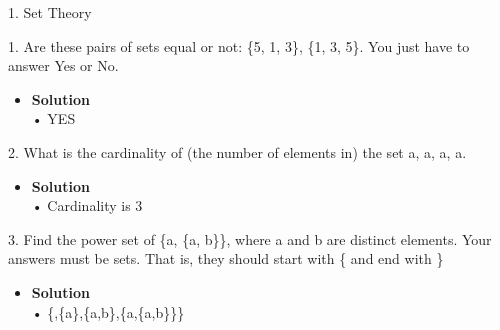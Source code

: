 \documentclass[11pt]{article}
\begin{document}


\begin{flushleft}
{\Large 1. Set Theory}
\end{flushleft}



\begin{enumerate}

\begin{flushleft}
{\large 1. Are these pairs of sets equal or not: \{5, 1, 3\}, \{1, 3, 5\}. You just have to answer Yes or No.}
\end{flushleft}

\begin{itemize}

\item \textbf{Solution}\\
\large • YES

\end {itemize}
\end {enumerate}

\begin{enumerate}

\begin{flushleft}
{\large 2. What is the cardinality of (the number of elements in) the set {a, {a}, {a, {a}}}.}
\end{flushleft}

\begin{itemize}

\item \textbf{Solution}\\
\large • Cardinality is 3

\end {itemize}
\end {enumerate}

\begin{enumerate}

\begin{flushleft}
{\large 3. Find the power set of \{a, \{a, b\}\}, where a and b are distinct elements. Your answers must be sets.
That is, they should start with \{ and end with \}}
\end{flushleft}

\begin{itemize}

\item \textbf{Solution}\\
\large • \{\emptyset,\{a\},\{a,b\},\{a,\{a,b\}\}\}

\end {itemize}
\end {enumerate}
\end{document}
